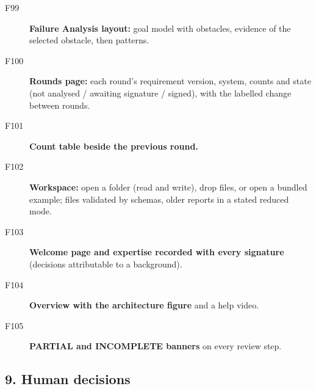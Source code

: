 \begin{description}
\item[F99] \textbf{Failure Analysis layout:} goal model with obstacles, evidence of the selected obstacle, then patterns. \tagnew{}
\item[F100] \textbf{Rounds page:} each round's requirement version, system, counts and state (not analysed / awaiting signature / signed), with the labelled change between rounds. 
\item[F101] \textbf{Count table beside the previous round.} 
\item[F102] \textbf{Workspace:} open a folder (read and write), drop files, or open a bundled example; files validated by schemas, older reports in a stated reduced mode. \taginfra
\item[F103] \textbf{Welcome page and expertise recorded with every signature} (decisions attributable to a background). \tagnew{}
\item[F104] \textbf{Overview with the architecture figure} and a help video. 
\item[F105] \textbf{PARTIAL and INCOMPLETE banners} on every review step. \tagnew{}
\end{description}

\subsection*{9. Human decisions}

